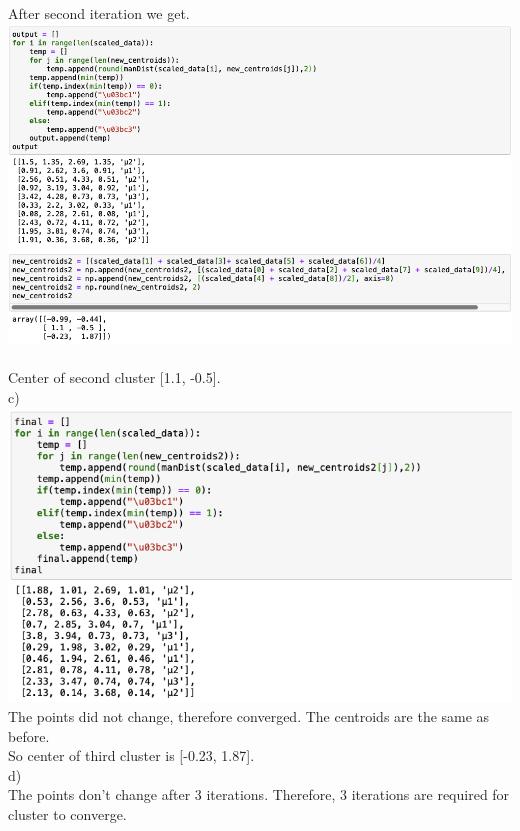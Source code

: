 \documentclass[11pt]{article}
\begin{document}
After second iteration we get. \\
\includegraphics[scale=0.4]{img13} \\
\\
Center of second cluster [1.1, -0.5]. \\

c) \\
\includegraphics[scale=0.4]{img14} \\
The points did not change, therefore converged. The centroids are the same as before. \\
So center of third cluster is [-0.23, 1.87]. \\

d) \\
The points don't change after 3 iterations. Therefore, 3 iterations are required for cluster to converge. \\
\end{document}
